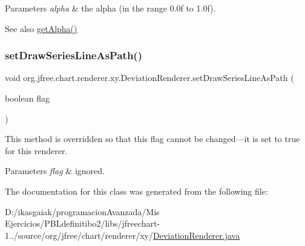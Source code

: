 \begin{DoxyParams}{Parameters}
{\em alpha} & the alpha (in the range 0.\+0f to 1.\+0f).\\
\hline
\end{DoxyParams}
\begin{DoxySeeAlso}{See also}
\mbox{\hyperlink{classorg_1_1jfree_1_1chart_1_1renderer_1_1xy_1_1_deviation_renderer_a8b1564f272400a7d1a1d67e665869c98}{get\+Alpha()}} 
\end{DoxySeeAlso}
\mbox{\label{classorg_1_1jfree_1_1chart_1_1renderer_1_1xy_1_1_deviation_renderer_acd18116f34208f6aa6409def9afb6a0e}} 
\subsubsection{\texorpdfstring{set\+Draw\+Series\+Line\+As\+Path()}{setDrawSeriesLineAsPath()}}
{\footnotesize\ttfamily void org.\+jfree.\+chart.\+renderer.\+xy.\+Deviation\+Renderer.\+set\+Draw\+Series\+Line\+As\+Path (\begin{DoxyParamCaption}\item[{boolean}]{flag }\end{DoxyParamCaption})}

This method is overridden so that this flag cannot be changed---it is set to {\ttfamily true} for this renderer.


\begin{DoxyParams}{Parameters}
{\em flag} & ignored. \\
\hline
\end{DoxyParams}


The documentation for this class was generated from the following file\+:\begin{DoxyCompactItemize}
\item 
D\+:/ikasgaiak/programacion\+Avanzada/\+Mis Ejercicios/\+P\+B\+Ldefinitibo2/libs/jfreechart-\/1../source/org/jfree/chart/renderer/xy/\mbox{\hyperlink{_deviation_renderer_8java}{Deviation\+Renderer.\+java}}\end{DoxyCompactItemize}
